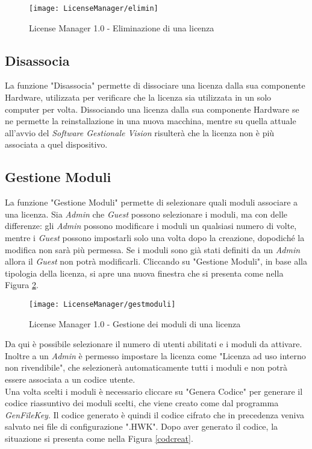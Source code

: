 \begin{figure}[!h] 
    \centering 
    \texttt{[image: LicenseManager/elimin]} 
    \caption{License Manager 1.0 - Eliminazione di una licenza}
\label{elim}
\end{figure}

\subsection{Disassocia}

La funzione "Disassocia" permette di dissociare una licenza dalla sua componente Hardware, utilizzata per verificare che la licenza sia utilizzata in un solo computer per volta. 
Dissociando una licenza dalla sua componente Hardware se ne permette la reinstallazione in una nuova macchina, mentre su quella attuale all’avvio del \textit{Software Gestionale Vision} risulterà che la licenza non è più associata a quel dispositivo.

\subsection{Gestione Moduli}

La funzione "Gestione Moduli" permette di selezionare quali moduli associare a una licenza. Sia \textit{Admin} che \textit{Guest} possono selezionare i moduli, ma con delle differenze: gli \textit{Admin} possono modificare i moduli un qualsiasi numero di volte, mentre i \textit{Guest} possono impostarli solo una volta dopo la creazione, dopodiché la modifica non sarà più permessa. Se i moduli sono già stati definiti da un \textit{Admin} allora il \textit{Guest} non potrà modificarli.
Cliccando su "Gestione Moduli", in base alla tipologia della licenza, si apre una nuova finestra che si presenta come nella Figura \ref{gest}.

\begin{figure}[!h] 
    \centering 
    \texttt{[image: LicenseManager/gestmoduli]} 
    \caption{License Manager 1.0 - Gestione dei moduli di una licenza}
\label{gest}
\end{figure}

Da qui è possibile selezionare il numero di utenti abilitati e i moduli da attivare. Inoltre a un \textit{Admin} è permesso impostare la licenza come "Licenza ad uso interno non rivendibile", che selezionerà automaticamente tutti i moduli e non potrà essere associata a un codice utente.\\
Una volta scelti i moduli è necessario cliccare su "Genera Codice" per generare il codice riassuntivo dei moduli scelti, che viene creato come dal programma \textit{GenFileKey}. Il codice generato è quindi il codice cifrato che in precedenza veniva salvato nei file di configurazione ".HWK".  Dopo aver generato il codice, la situazione si presenta come nella Figura \ref{codcreat}.

